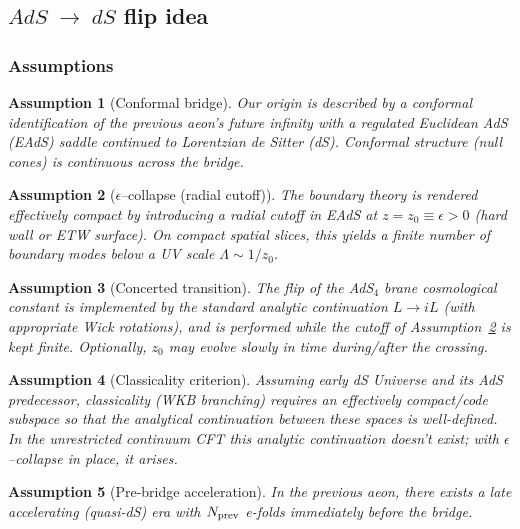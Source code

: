 \documentclass[10pt]{article}
\theoremstyle{definition}
\theoremstyle{plain}
\newtheorem{assumption}{Assumption}[section]
\begin{document}
\subsection{\texorpdfstring{$AdS\;\rightarrow\;dS$ flip idea}{AdS->dS flip idea}}\label{subsec:uom-main-001}

\subsubsection*{Assumptions}\label{subsubsec:uom-main-001}

\begin{assumption}[Conformal bridge]
\label{ass:bridge}
Our origin is described by a conformal identification of the previous aeon's future infinity with a regulated Euclidean AdS (EAdS) saddle continued to Lorentzian de Sitter (dS). Conformal structure (null cones) is continuous across the bridge.
\end{assumption}

\begin{assumption}[$\epsilon$--collapse (radial cutoff)]
\label{ass:epsilon}
The boundary theory is rendered effectively compact by introducing a radial cutoff in EAdS at $z=z_0 \equiv \epsilon>0$ (hard wall or ETW surface). On compact spatial slices, this yields a finite number of boundary modes below a UV scale $\Lambda\sim 1/z_0$.
\end{assumption}

\begin{assumption}[Concerted transition]
\label{ass:concerted}
The flip of the AdS$_4$ brane cosmological constant is implemented by the standard analytic continuation $L\to iL$ (with appropriate Wick rotations), and is performed while the cutoff of Assumption~\ref{ass:epsilon} is \emph{kept finite}. Optionally, $z_0$ may evolve slowly in time during/after the crossing.
\end{assumption}

\begin{assumption}[Classicality criterion]
\label{ass:classicality}
Assuming early dS Universe and its AdS predecessor, classicality (WKB branching) requires an effectively compact/code subspace so that the analytical continuation between these spaces is well-defined. In the unrestricted continuum CFT this analytic continuation doesn't exist; with $\epsilon$--collapse in place, it arises.
\end{assumption}

\begin{assumption}[Pre-bridge acceleration]
\label{ass:prevacc}
In the previous aeon, there exists a late accelerating (quasi-dS) era with $N_{\rm prev}$ e-folds immediately before the bridge.
\end{assumption}
\end{document}
